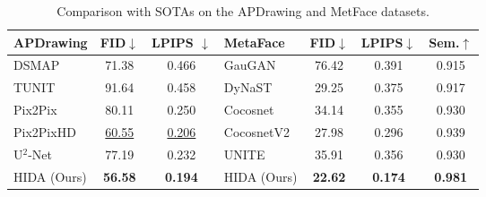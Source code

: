 \documentclass[10pt,twocolumn,letterpaper]{article}
\begin{document}
\begin{table}
	\tabcolsep=1.5pt
	\footnotesize
	\centering
	\caption{Comparison with SOTAs on the APDrawing and MetFace datasets.}
	\label{tab:addcomp}
		\begin{tabular}{lcc|lccc}
			\toprule
%			
\textbf{APDrawing}	&	FID$\downarrow$		&	LPIPS $\downarrow$	& \textbf{MetaFace} &	FID$\downarrow$	&	LPIPS$\downarrow$ &	Sem.$\uparrow$	\\
			\midrule	
			DSMAP \cite{chang2020domain}	&	71.38	&	0.466 	 & GauGAN \cite{Park2019GauGAN}	&	76.42	&	0.391	 &	0.915	\\
			TUNIT \cite{Baek2021tunit}	&	91.64	&	0.458 &  DyNaST \cite{liu2022dynast}	&	29.25	&	0.375	&	0.917		\\
			Pix2Pix \cite{Isola2017Pix2Pix}	&	80.11	&	0.250  & Cocosnet \cite{cocosnet}	&	34.14	&	0.355	&		0.930		\\
			Pix2PixHD \cite{Wang2017Pix2PixHD}	&	\underline{60.55}	&	\underline{0.206}  & 	CocosnetV2 \cite{zhang2021cocosnetv2}	&	27.98	&	0.296	&	0.939	\\
            U$^2$-Net \cite{qin2020u2net}	&	77.19	&	0.232  & 	UNITE \cite{zhan2021unite}	&	35.91	&	0.356	&	0.930	\\
            HIDA (Ours)	&	\textbf{56.58}	&	\textbf{0.194} 	 &  HIDA (Ours)	&	\textbf{22.62}    &	\textbf{0.174}	&	   \textbf{0.981}  	  \\
			\bottomrule
		\end{tabular}
\end{table}
\end{document}
